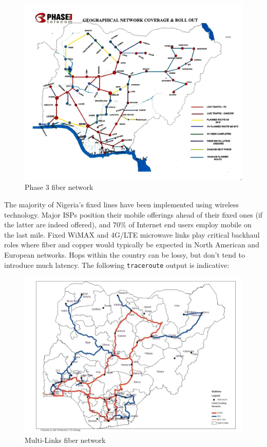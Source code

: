 \documentclass[]{sigplanconf}
\begin{document}
\begin{itemize}
\begin{figure}[h]
\centering
\includegraphics[width=\linewidth]{phase3.jpg}
\caption{Phase 3 fiber network}
\end{figure}

	The majority of Nigeria's fixed lines have been implemented using wireless technology\cite{fixedline}.
	Major ISPs position their mobile offerings ahead of their fixed ones (if
	the latter are indeed offered), and 70\% of Internet end users employ
	mobile on the last mile. Fixed WiMAX and 4G/LTE microwave links play
	critical backhaul roles where fiber and copper would typically be expected
	in North American and European networks\cite{wimax}. Hops within the
	country can be lossy, but don't tend to introduce much latency. The
	following \texttt{traceroute} output is indicative:

\begin{figure}[t]
\centering
\includegraphics[width=\linewidth]{multilinks.jpg}
\caption{Multi-Links fiber network}
\end{figure}


\end{itemize}
\end{document}
